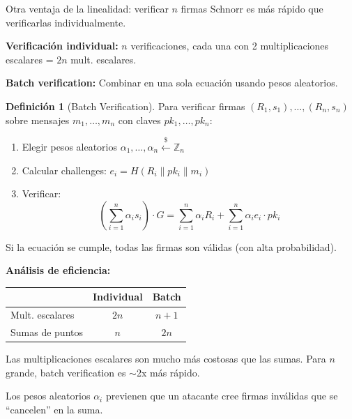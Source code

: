 \documentclass[11pt,a4paper,twoside,openright]{book}
\theoremstyle{definition}
\newtheorem{definition}{Definición}[chapter]
\theoremstyle{plain}
\theoremstyle{remark}
\newcommand{\Z}{\mathbb{Z}}
\begin{document}
\begin{keyidea}
Otra ventaja de la linealidad: verificar $n$ firmas Schnorr es más rápido que verificarlas individualmente.

\textbf{Verificación individual:} $n$ verificaciones, cada una con 2 multiplicaciones escalares = $2n$ mult. escalares.

\textbf{Batch verification:} Combinar en una sola ecuación usando pesos aleatorios.
\end{keyidea}

\begin{definition}[Batch Verification]
Para verificar firmas $(R_1, s_1), \ldots, (R_n, s_n)$ sobre mensajes $m_1, \ldots, m_n$ con claves $pk_1, \ldots, pk_n$:

\begin{enumerate}
    \item Elegir pesos aleatorios $\alpha_1, \ldots, \alpha_n \xleftarrow{\$} \Z_n$
    \item Calcular challenges: $e_i = H(R_i \| pk_i \| m_i)$
    \item Verificar:
    \[ \left(\sum_{i=1}^n \alpha_i s_i\right) \cdot G = \sum_{i=1}^n \alpha_i R_i + \sum_{i=1}^n \alpha_i e_i \cdot pk_i \]
\end{enumerate}

Si la ecuación se cumple, todas las firmas son válidas (con alta probabilidad).
\end{definition}

\begin{mathnote}
\textbf{Análisis de eficiencia:}

\begin{center}
\begin{tabular}{lcc}
\toprule
& \textbf{Individual} & \textbf{Batch} \\
\midrule
Mult. escalares & $2n$ & $n + 1$ \\
Sumas de puntos & $n$ & $2n$ \\
\bottomrule
\end{tabular}
\end{center}

Las multiplicaciones escalares son mucho más costosas que las sumas. Para $n$ grande, batch verification es $\sim$2x más rápido.

Los pesos aleatorios $\alpha_i$ previenen que un atacante cree firmas inválidas que se ``cancelen'' en la suma.
\end{mathnote}

\end{document}
